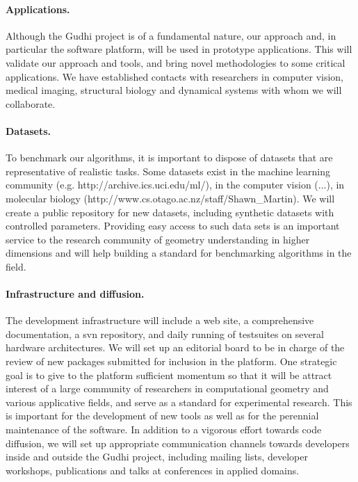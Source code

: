 \paragraph{Applications.}
Although the Gudhi project is of a fundamental nature, our approach
and, in particular the software platform, will be used in prototype
applications.  This will validate our approach and tools, and bring
novel methodologies to some critical applications. We have established
contacts with researchers in computer vision, medical imaging,
structural biology and dynamical systems with whom we will
collaborate. 

\paragraph{Datasets.}
To benchmark our algorithms, it is important to dispose of datasets
that are representative of realistic tasks. Some datasets exist in the
machine learning community (e.g. http://archive.ics.uci.edu/ml/), in
the computer vision (...), in molecular biology
(http://www.cs.otago.ac.nz/staff/Shawn\_Martin). We will create a
public repository for new  datasets, including synthetic datasets with controlled
parameters. Providing easy access to such data sets is an important service to the
research community of geometry understanding in higher dimensions and 
will help building a standard for benchmarking algorithms in the field.


\paragraph{Infrastructure and diffusion.}
The development infrastructure will include a web site, a
comprehensive documentation, a svn repository, and daily running of
testsuites on several hardware architectures.  We will set up an
editorial board to be in charge of the review of new packages
submitted for inclusion in the platform.  One strategic goal is to
give to the platform sufficient momentum so that it will be attract
interest of a large community of researchers in computational geometry
and various applicative fields, and serve as a standard for
experimental research. This is important for the development of new
tools as well as for the perennial maintenance of the software. In
addition to a vigorous effort towards code diffusion, we will set up
appropriate communication channels towards developers inside and
outside the Gudhi project, including mailing lists, developer
workshops, publications and talks at conferences in applied domains.















